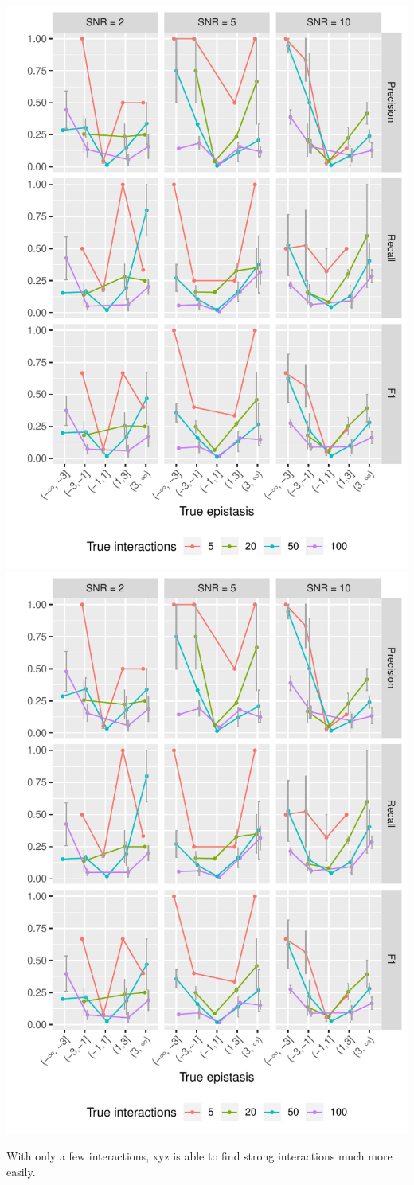 \begin{frame}
	\begin{minipage}{0.9\linewidth}
		\centering
		\includegraphics[width=0.5\linewidth]{"FXstrength/FXstrength_PRF_n10000_L100_tno_mult1"}%
		\includegraphics[width=0.5\linewidth]{"FXstrength/FXstrength_PRF_n10000_L100_tyes_mult1"}
	\end{minipage}

	With only a few interactions, xyz is able to find strong interactions much more easily.
\end{frame}

